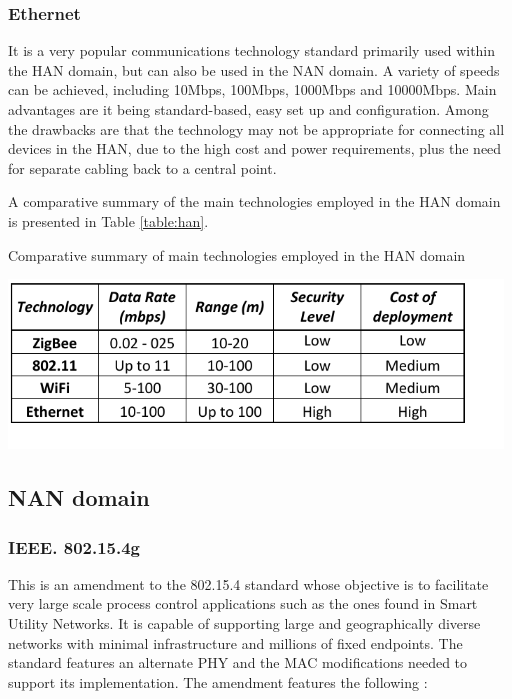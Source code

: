 \documentclass[11pt,draftclsnofoot,onecolumn]{IEEEtran}
\begin{document}
\subsubsection{Ethernet}\label{tech::ethernet}

It is a very popular communications technology standard primarily used within the HAN domain, but can also be used in the NAN domain. A variety of speeds can be achieved, including 10Mbps, 100Mbps, 1000Mbps and 10000Mbps. Main advantages are it being standard-based, easy set up and configuration. Among the drawbacks are that the technology may not be appropriate for connecting all devices in the HAN, due to the high cost and power requirements, plus the need for separate cabling back to a central point.

A comparative summary of the main technologies employed in the HAN domain is presented in  Table \ref{table:han}.

\begin{table}[hp!]
  \caption{Comparative summary of main technologies employed in the HAN domain}
  \label{table:han}
\centering
\includegraphics [height=4.5cm] {HAN-TECH}
\end{table}

\subsection{NAN domain}

\subsubsection{IEEE. 802.15.4g}\label{tech::802154g}

This is an amendment to the 802.15.4 standard whose objective is to facilitate very large scale process control applications such as the ones found in Smart Utility Networks. It is capable of supporting large and geographically diverse networks with minimal infrastructure and millions of fixed endpoints. The standard features an alternate PHY and the MAC modifications needed to support its implementation. The amendment features the following \cite{Shin2010}:
\end{document}

